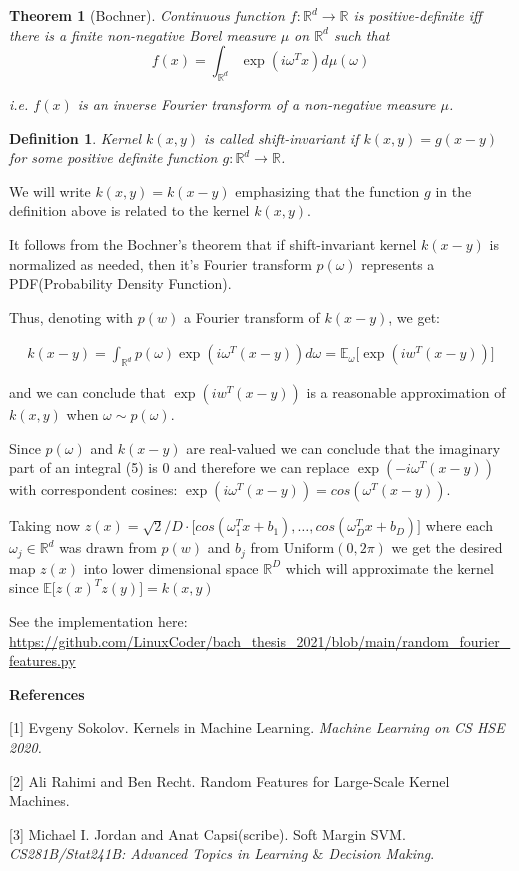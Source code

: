 \documentclass{article}
\theoremstyle{bfnote}
\newtheorem{defi}{Definition}
\newtheorem{thm}{Theorem}
\begin{document}
	\begin{thm}[Bochner]
		Continuous function $f:\mathbb{R}^d \rightarrow \mathbb{R}$ is positive-definite iff there is a finite non-negative Borel
		measure $\mu$ on $\mathbb{R}^d$ such that
		$$
		f(x) =  \int_{\mathbb{R}^d} \exp(i \omega ^T x) d \mu(\omega)
		$$
		
		i.e. $f(x)$ is an inverse Fourier transform of a non-negative measure $\mu$.
	\end{thm}

	\begin{defi}
		Kernel $k(x, y)$ is called \textit{shift-invariant} if $k(x, y)=g(x-y)$ for some positive definite function $g:\mathbb{R}^d \rightarrow \mathbb{R}$. 
	\end{defi}
		We will write $k(x, y)=k(x-y)$ emphasizing that the function $g$ in the definition above is related to the kernel $k(x,y)$.

	It follows from the Bochner's theorem that if shift-invariant kernel $k(x-y)$ is normalized as needed, then it's Fourier transform $p(\omega)$ represents a PDF(Probability Density Function).
	
	Thus, denoting with $p(w)$ a Fourier transform of $k(x-y)$, we get:
	
	\begin{gather}
	k(x-y)=\int_{\mathbb{R}^d} p(\omega) \exp(i\omega^T (x-y)) d\omega
	=\mathbb{E}_\omega \bigg[ \exp(iw^T (x-y)) \bigg] 
	\end{gather}
	
	and we can conclude that $\exp(iw^T (x-y))$ is a reasonable approximation of $k(x, y)$ when $\omega \sim p(\omega)$.
	
	Since $p(\omega)$ and $k(x-y)$ are real-valued we can conclude that the imaginary part of an integral (5) is 0 and therefore we can replace $\exp(-i\omega^T (x-y))$ with correspondent cosines: $\exp(i\omega^T (x-y))=cos(\omega^T (x-y))$.
	
	Taking now $z(x)=\sqrt{2}/D \cdot \big[cos(\omega_1^T x + b_1), \dots, cos(\omega_D^T x + b_D) \big]$ where each $\omega_j \in \mathbb{R}^d$ was drawn from $p(w)$ and $b_j$ from $\text{Uniform}(0, 2\pi)$ we get the desired map $z(x)$ into lower dimensional space $\mathbb{R}^D$ which will approximate the kernel since $\mathbb{E}\big[z(x)^T z(y)\big]=k(x, y)$
	
	See the implementation here: \url{https://github.com/LinuxCoder/bach_thesis_2021/blob/main/random_fourier_features.py}
	
	\textbf{References}
	
	[1] Evgeny Sokolov. Kernels in Machine Learning. \textit{Machine Learning on CS HSE 2020.}
	
	[2] Ali Rahimi and Ben Recht. Random Features for Large-Scale Kernel Machines.
	
	[3] Michael I. Jordan and Anat Capsi(scribe). Soft Margin SVM. \textit{CS281B/Stat241B: Advanced Topics in Learning $\&$ Decision Making}.
		
\end{document}
